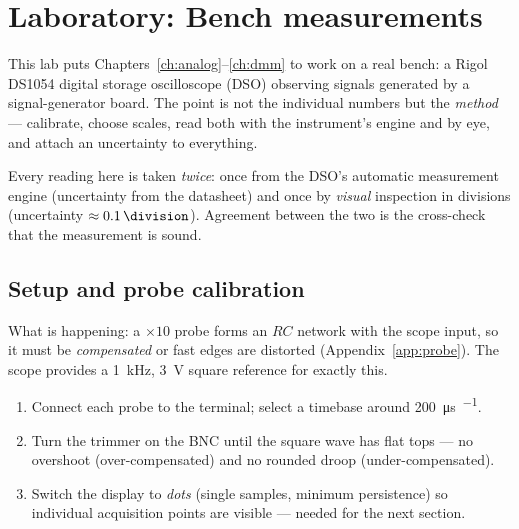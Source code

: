 \documentclass[11pt,a4paper,oneside]{book}
\begin{document}
\chapter{Laboratory: Bench measurements}\label{ch:lab-meas}

This lab puts Chapters~\ref{ch:analog}--\ref{ch:dmm} to work on a real bench: a
Rigol DS1054 digital storage oscilloscope (DSO) observing signals generated by a
signal-generator board. The point is not the individual numbers but the \emph{method} ---
calibrate, choose scales, read both with the instrument's engine and by eye, and
attach an uncertainty to everything.

\begin{keyidea}
Every reading here is taken \emph{twice}: once from the DSO's automatic
measurement engine (uncertainty from the datasheet) and once by \emph{visual}
inspection in divisions (uncertainty $\approx\qty{0.1}{\division}$). Agreement
between the two is the cross-check that the measurement is sound.
\end{keyidea}

\section{Setup and probe calibration}

What is happening: a $\times 10$ probe forms an $RC$ network with the scope input,
so it must be \emph{compensated} or fast edges are distorted
(Appendix~\ref{app:probe}). The scope provides a \qty{1}{\kilo\hertz},
\qty{3}{\volt} square reference for exactly this.

\begin{protocol}
\begin{enumerate}[leftmargin=1.5cm]
  \item Connect each probe to the  terminal; select a timebase
        around \qty{200}{\micro\second\per\division}.
  \item Turn the trimmer on the BNC until the square wave has flat tops --- no
        overshoot (over-compensated) and no rounded droop (under-compensated).
  \item Switch the display to \emph{dots} (single samples, minimum persistence)
        so individual acquisition points are visible --- needed for the next
        section.
\end{enumerate}
\end{protocol}
\end{document}
